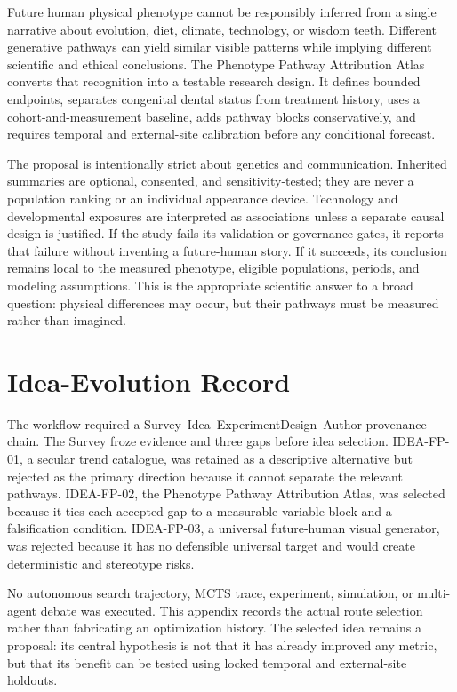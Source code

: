 \documentclass[conference]{IEEEtran}
\begin{document}
Future human physical phenotype cannot be responsibly inferred from a single
narrative about evolution, diet, climate, technology, or wisdom teeth.
Different generative pathways can yield similar visible patterns while
implying different scientific and ethical conclusions. The Phenotype Pathway
Attribution Atlas converts that recognition into a testable research design.
It defines bounded endpoints, separates congenital dental status from
treatment history, uses a cohort-and-measurement baseline, adds pathway blocks
conservatively, and requires temporal and external-site calibration before any
conditional forecast.

The proposal is intentionally strict about genetics and communication.
Inherited summaries are optional, consented, and sensitivity-tested; they are
never a population ranking or an individual appearance device. Technology and
developmental exposures are interpreted as associations unless a separate
causal design is justified. If the study fails its validation or governance
gates, it reports that failure without inventing a future-human story. If it
succeeds, its conclusion remains local to the measured phenotype, eligible
populations, periods, and modeling assumptions. This is the appropriate
scientific answer to a broad question: physical differences may occur, but
their pathways must be measured rather than imagined.

\appendices
\section{Idea-Evolution Record}

The workflow required a Survey--Idea--ExperimentDesign--Author provenance
chain. The Survey froze evidence and three gaps before idea selection.
IDEA-FP-01, a secular trend catalogue, was retained as a descriptive
alternative but rejected as the primary direction because it cannot separate
the relevant pathways. IDEA-FP-02, the Phenotype Pathway Attribution Atlas,
was selected because it ties each accepted gap to a measurable variable block
and a falsification condition. IDEA-FP-03, a universal future-human visual
generator, was rejected because it has no defensible universal target and
would create deterministic and stereotype risks.

No autonomous search trajectory, MCTS trace, experiment, simulation, or
multi-agent debate was executed. This appendix records the actual route
selection rather than fabricating an optimization history. The selected idea
remains a proposal: its central hypothesis is not that it has already improved
any metric, but that its benefit can be tested using locked temporal and
external-site holdouts.
\end{document}
